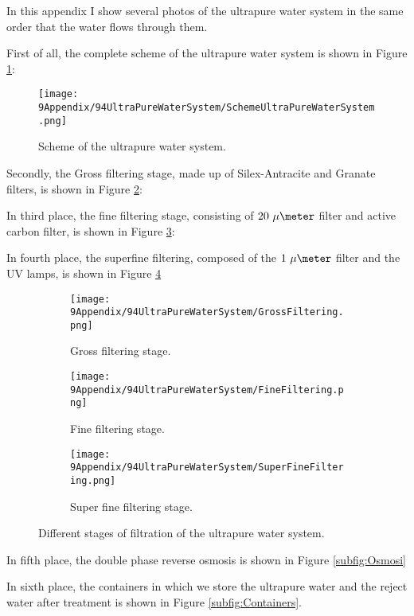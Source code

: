 In this appendix I show several photos of the ultrapure water system in the same order that the water flows through them.

First of all, the complete scheme of the ultrapure water system is shown in Figure \ref{fig:SchemeUPWS}:

\begin{figure}[htbp]
\centering
\texttt{[image: 9Appendix/94UltraPureWaterSystem/SchemeUltraPureWaterSystem.png]}
\caption{Scheme of the ultrapure water system.\label{fig:SchemeUPWS}}
\end{figure}

Secondly, the Gross filtering stage, made up of Silex-Antracite and Granate filters, is shown in Figure \ref{subfig:GrossFiltering}:

In third place, the fine filtering stage, consisting of $20~\mu\meter$ filter and active carbon filter, is shown in Figure \ref{subfig:FineFiltering}:

In fourth place, the superfine filtering, composed of the $1~\mu\meter$ filter and the UV lamps, is shown in Figure \ref{subfig:SuperFineFiltering}

\begin{figure}
\centering
    \begin{subfigure}[b]{0.3\textwidth}
    \centering
    \texttt{[image: 9Appendix/94UltraPureWaterSystem/GrossFiltering.png]}  
    \caption{Gross filtering stage.\label{subfig:GrossFiltering}}
    \end{subfigure}
    \hfill
    \begin{subfigure}[b]{0.3\textwidth}
    \centering
    \texttt{[image: 9Appendix/94UltraPureWaterSystem/FineFiltering.png]}  
    \caption{Fine filtering stage.\label{subfig:FineFiltering}}
    \end{subfigure}
    \hfill
    \begin{subfigure}[b]{0.3\textwidth}
    \centering
    \texttt{[image: 9Appendix/94UltraPureWaterSystem/SuperFineFiltering.png]}  
    \caption{Super fine filtering stage.\label{subfig:SuperFineFiltering}}
    \end{subfigure}
 \caption{Different stages of filtration of the ultrapure water system.}
 \label{fig:UltraPureWaterStages}
\end{figure}

In fifth place, the double phase reverse osmosis is shown in Figure \ref{subfig:Osmosi}

In sixth place, the containers in which we store the ultrapure water and the reject water after treatment is shown in Figure \ref{subfig:Containers}.

